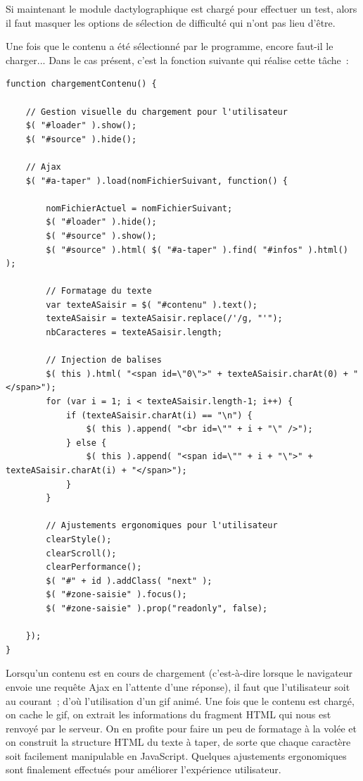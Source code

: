 \documentclass[a4paper,12pt]{article}
\begin{document}
Si maintenant le module dactylographique est chargé pour effectuer un test, alors il faut masquer les options de sélection de difficulté qui n'ont pas lieu d'être.

Une fois que le contenu a été sélectionné par le programme, encore faut-il le charger... Dans le cas présent, c'est la fonction suivante qui réalise cette tâche~:

\begin{lstlisting}
function chargementContenu() {
    
    // Gestion visuelle du chargement pour l'utilisateur
    $( "#loader" ).show();
    $( "#source" ).hide();
    
    // Ajax
    $( "#a-taper" ).load(nomFichierSuivant, function() {
        
        nomFichierActuel = nomFichierSuivant;
        $( "#loader" ).hide();
        $( "#source" ).show();
        $( "#source" ).html( $( "#a-taper" ).find( "#infos" ).html() );
        
        // Formatage du texte
        var texteASaisir = $( "#contenu" ).text();
        texteASaisir = texteASaisir.replace(/'/g, "'");
        nbCaracteres = texteASaisir.length;
        
        // Injection de balises
        $( this ).html( "<span id=\"0\">" + texteASaisir.charAt(0) + "</span>");
        for (var i = 1; i < texteASaisir.length-1; i++) {
            if (texteASaisir.charAt(i) == "\n") {
                $( this ).append( "<br id=\"" + i + "\" />");
            } else {
                $( this ).append( "<span id=\"" + i + "\">" + texteASaisir.charAt(i) + "</span>");
            }
        }
        
        // Ajustements ergonomiques pour l'utilisateur
        clearStyle();
        clearScroll();
        clearPerformance();
        $( "#" + id ).addClass( "next" );
        $( "#zone-saisie" ).focus();
        $( "#zone-saisie" ).prop("readonly", false);
    
    });
}
\end{lstlisting}


Lorsqu'un contenu est en cours de chargement (c'est-à-dire lorsque le navigateur envoie une requête Ajax en l'attente d'une réponse), il faut que l'utilisateur soit au courant~; d'où l'utilisation d'un gif animé. Une fois que le contenu est chargé, on cache le gif, on extrait les informations du fragment HTML qui nous est renvoyé par le serveur. On en profite pour faire un peu de formatage à la volée et on construit la structure HTML du texte à taper, de sorte que chaque caractère soit facilement manipulable en JavaScript. Quelques ajustements ergonomiques sont finalement effectués pour améliorer l'expérience utilisateur.
\end{document}
